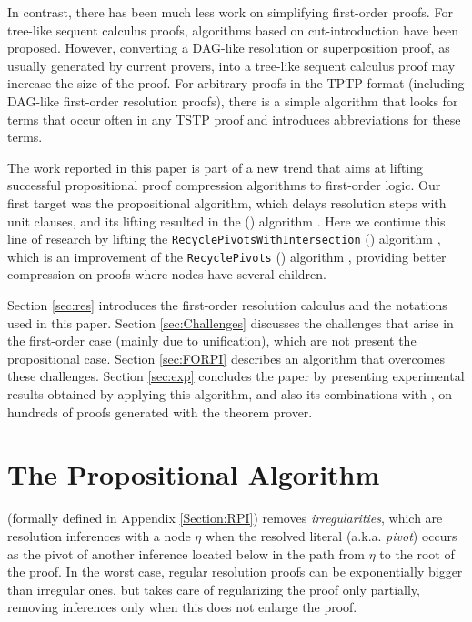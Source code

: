 \documentclass{llncs}
\begin{document}
In contrast, there has been much less work on simplifying first-order proofs. For tree-like sequent calculus proofs, algorithms based on cut-introduction \cite{BrunoLPAR,Hetzl} have been proposed. However, converting a DAG-like resolution or superposition proof, as usually generated by current provers, into a tree-like sequent calculus proof may increase the size of the proof. For arbitrary proofs in the TPTP \cite{TPTP} format (including DAG-like first-order resolution proofs), there is a simple algorithm \cite{LPARCzech} that looks for terms that occur often in any TSTP \cite{TPTP} proof and introduces abbreviations for these terms. 

The work reported in this paper is part of a new trend that aims at lifting successful propositional proof compression algorithms to first-order logic. Our first target was the propositional {\LowerUnits} algorithm, which delays resolution steps with unit clauses, and its lifting resulted in the 
{\SFOLowerUnits} 
({\GFOLU}) algorithm \cite{GFOLU}. Here we continue this line of research by lifting the 
\texttt{Recycle\-PivotsWithIntersection}
({\RPI}) algorithm \cite{LURPI}, which is an improvement of the \texttt{RecyclePivots} ({\RP}) algorithm \cite{RP08}, providing better compression on proofs where nodes have several children. 

Section \ref{sec:res} introduces the first-order resolution calculus and the notations used in this paper. Section \ref{sec:Challenges} discusses the challenges that arise in the first-order case (mainly due to unification), which are not present the propositional case. Section \ref{sec:FORPI} describes an algorithm that overcomes these challenges. Section \ref{sec:exp} concludes the paper by presenting experimental results obtained by applying this algorithm, and also its combinations with {\GFOLU}, on hundreds of proofs generated with the {\SPASS} theorem prover. 





\section{The Propositional Algorithm}

{\RPI} (formally defined in Appendix \ref{Section:RPI}) removes \emph{irregularities}, which are resolution inferences with a node $\eta$ when the resolved literal (a.k.a. \emph{pivot}) occurs as the pivot of another inference located below in the path from $\eta$ to the root of the proof. In the worst case, regular resolution proofs can be exponentially bigger than irregular ones, but {\RPI} takes care of regularizing the proof only partially, removing inferences only when this does not enlarge the proof.
\end{document}
